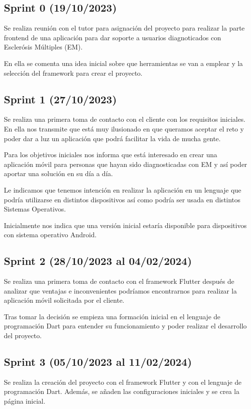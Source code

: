 \subsection{Sprint 0 (19/10/2023)}
Se realiza reunión con el tutor {\nomtutor} para asignación del proyecto para realizar la parte frontend de una aplicación
para dar soporte a usuarios diagnoticados con Esclerósis Múltiples (EM).

En ella se comenta una idea inicial sobre que herramientas se van a emplear y la selección del framework para crear el proyecto.

\subsection{Sprint 1 (27/10/2023)}
Se realiza una primera toma de contacto con el cliente con los requisitos iniciales. En ella nos transmite que está muy ilusionado en 
que queramos aceptar el reto y poder dar a luz un aplicación que podrá facilitar la vida de mucha gente.

Para los objetivos iniciales nos informa que está interesado en crear una aplicación móvil para personas que hayan sido diagnosticadas
con EM y así poder aportar una solución en su día a día.

Le indicamos que tenemos intención en realizar la aplicación en un lenguaje que podría utilizarse en distintos dispositivos así como podría 
ser usada en distintos Sistemas Operativos. 

Inicialmente nos indica que una versión inicial estaría disponible para dispositivos con sistema operativo Android.

\subsection{Sprint 2 (28/10/2023 al 04/02/2024)}
Se realiza una primera toma de contacto con el framework Flutter después de analizar que ventajas e inconvenientes podríamos encontrarnos
para realizar la aplicación móvil solicitada por el cliente.

Tras tomar la decisión se empieza una formación inicial en el lenguaje de programación Dart para entender su funcionamiento y poder realizar
el desarrollo del proyecto.

\subsection{Sprint 3 (05/10/2023 al 11/02/2024)}
Se realiza la creación del proyecto con el framework Flutter y con el lenguaje de programación Dart. Además, se añaden las configuraciones iniciales
y se crea la página inicial.

